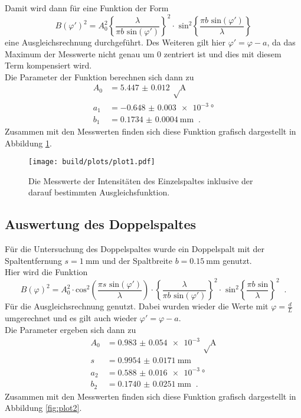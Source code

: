 \noindent
Damit wird dann für eine Funktion der Form
\begin{equation}
    B(\varphi')^2 = A_0^2 \left\{ \frac{\lambda}{\pi b \text{ sin}(\varphi')} \right\}^2 \cdot \text{ sin}^2 
    \left\{\frac{\pi b \text{ sin}(\varphi')}{\lambda} \right\}
    \label{eqn:einzel}
\end{equation}
\noindent eine Ausgleichsrechnung durchgeführt. Des Weiteren gilt hier $\varphi'=\varphi-a$, da das Maximum der Messwerte nicht genau um $0$ zentriert ist und dies mit diesem Term kompensiert wird.\\
Die Parameter der Funktion berechnen sich dann zu
\begin{align*}
    A_0&=\SI{5.447(0012)}{\sqrt\ampere}\\
    a_1&=\SI{-0.648(0003)e-3}{\degree}\\
    b_1&=\SI{0.1734(00004)}{\milli\metre}\; \; .
\end{align*}
\noindent Zusammen mit den Messwerten finden sich diese Funktion grafisch dargestellt in Abbildung \ref{fig:plot1}.
\begin{figure}[H]
    \centering
    \texttt{[image: build/plots/plot1.pdf]}
    \caption{Die Messwerte der Intensitäten des Einzelspaltes inklusive der darauf bestimmten Ausgleichsfunktion.}
    \label{fig:plot1}
  \end{figure}



\newpage
  \subsection{Auswertung des Doppelspaltes}

  \noindent Für die Untersuchung des Doppelspaltes wurde ein Doppelspalt mit der Spaltentfernung $s =\SI{1}{\milli\metre}$ und der Spaltbreite $b={\SI{0.15}{\milli\metre}}$ genutzt.\\
  Hier wird die Funktion 
  \begin{equation}
    B(\varphi)^2 = A_0^2 \cdot \text{cos}^2 \left( \frac{\pi s \text{ sin}(\varphi')}{\lambda} \right) \cdot 
    \left\{ \frac{\lambda}{\pi b \text{ sin}(\varphi')} \right\}^2 \cdot \text{ sin}^2 \left\{ \frac{ \pi b \text{ sin}}{\lambda} \right\}^2 \; \;.
  \end{equation}
  Für die Ausgleichsrechnung genutzt. Dabei wurden wieder die Werte mit $\varphi=\frac{d}{L}$ umgerechnet und es gilt auch wieder $\varphi'=\varphi-a$.\\
  Die Parameter ergeben sich dann zu
  \begin{align*}
    A_0&=\SI{0.983(0054)e-3}{\sqrt\ampere}\\
    s&=\SI{0.9954(00171)}{\milli\metre}\\
    a_2&=\SI{0.588(0016)e-3}{\degree}\\
    b_2&=\SI{0.1740(00251)}{\milli\metre}\; \; .
  \end{align*}
  \noindent Zusammen mit den Messwerten finden sich diese Funktion grafisch dargestellt in Abbildung \ref{fig:plot2}.

